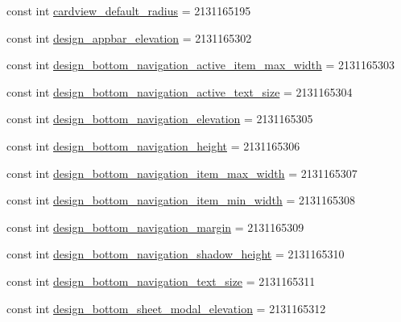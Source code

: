 \begin{DoxyCompactItemize}
const int \mbox{\hyperlink{class_f_w_p_s___app_1_1_droid_1_1_resource_1_1_dimension_a36f982b795291e6a944250636004b40b}{cardview\+\_\+default\+\_\+radius}} = 2131165195
\item 
const int \mbox{\hyperlink{class_f_w_p_s___app_1_1_droid_1_1_resource_1_1_dimension_a61ab51c0e308d751aa0cc3004005dc23}{design\+\_\+appbar\+\_\+elevation}} = 2131165302
\item 
const int \mbox{\hyperlink{class_f_w_p_s___app_1_1_droid_1_1_resource_1_1_dimension_a9c4b31d203d04da5a07a6b5d659f8b7d}{design\+\_\+bottom\+\_\+navigation\+\_\+active\+\_\+item\+\_\+max\+\_\+width}} = 2131165303
\item 
const int \mbox{\hyperlink{class_f_w_p_s___app_1_1_droid_1_1_resource_1_1_dimension_a9b4615f90c9b7da3f0ccc255144d57f1}{design\+\_\+bottom\+\_\+navigation\+\_\+active\+\_\+text\+\_\+size}} = 2131165304
\item 
const int \mbox{\hyperlink{class_f_w_p_s___app_1_1_droid_1_1_resource_1_1_dimension_acdddb7a8418cb3f9ef60f2ae9bedd155}{design\+\_\+bottom\+\_\+navigation\+\_\+elevation}} = 2131165305
\item 
const int \mbox{\hyperlink{class_f_w_p_s___app_1_1_droid_1_1_resource_1_1_dimension_a47dcc60453bc39ec077808b26361bf86}{design\+\_\+bottom\+\_\+navigation\+\_\+height}} = 2131165306
\item 
const int \mbox{\hyperlink{class_f_w_p_s___app_1_1_droid_1_1_resource_1_1_dimension_a575faea4bdbde28c0e5782840d9b7d84}{design\+\_\+bottom\+\_\+navigation\+\_\+item\+\_\+max\+\_\+width}} = 2131165307
\item 
const int \mbox{\hyperlink{class_f_w_p_s___app_1_1_droid_1_1_resource_1_1_dimension_ad97329d080393b19ba803f8c10d7d48f}{design\+\_\+bottom\+\_\+navigation\+\_\+item\+\_\+min\+\_\+width}} = 2131165308
\item 
const int \mbox{\hyperlink{class_f_w_p_s___app_1_1_droid_1_1_resource_1_1_dimension_a813c0dbd5b256cd9127f3c27fc4f58bc}{design\+\_\+bottom\+\_\+navigation\+\_\+margin}} = 2131165309
\item 
const int \mbox{\hyperlink{class_f_w_p_s___app_1_1_droid_1_1_resource_1_1_dimension_a06a1d6035256e82848b5ed2b4ade3c7e}{design\+\_\+bottom\+\_\+navigation\+\_\+shadow\+\_\+height}} = 2131165310
\item 
const int \mbox{\hyperlink{class_f_w_p_s___app_1_1_droid_1_1_resource_1_1_dimension_a0f1b806ad710561041bacb2b0a9b2b7c}{design\+\_\+bottom\+\_\+navigation\+\_\+text\+\_\+size}} = 2131165311
\item 
const int \mbox{\hyperlink{class_f_w_p_s___app_1_1_droid_1_1_resource_1_1_dimension_a3b4c9c017cca15efe044be005f19046a}{design\+\_\+bottom\+\_\+sheet\+\_\+modal\+\_\+elevation}} = 2131165312

\end{DoxyCompactItemize}
